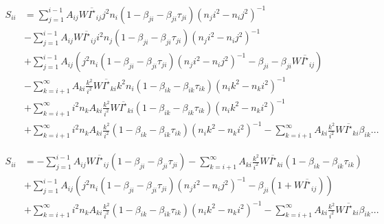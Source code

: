 \documentclass{article}
\begin{document}
\begin{equation}
    \begin{aligned}
        S_{ii} &= \sum\limits_{j=1}^{i-1} A_{ij}W\overline{I^\star}_{ij}j^2n_i (1 - \beta_{ji} - \beta_{ji}\tau_{ji})(n_ji^2 - n_ij^2)^{-1}\\
        &-\sum\limits_{j=1}^{i-1} A_{ij}W\overline{I^\star}_{ij}i^2n_j(1 - \beta_{ji} - \beta_{ji}\tau_{ji})(n_ji^2 - n_ij^2)^{-1}\\
        &+\sum\limits_{j=1}^{i-1} A_{ij}\left(j^2n_i (1 - \beta_{ji} - \beta_{ji}\tau_{ji})(n_ji^2 - n_ij^2)^{-1} -\beta_{ji}-\beta_{ji}W\overline{I^\star}_{ij}\right)\\
        &-\sum\limits_{k=i+1}^\infty A_{ki}\frac{k^2}{i^2}W\overline{I^\star}_{ki}k^2n_i(1 - \beta_{ik} - \beta_{ik}\tau_{ik})(n_ik^2 - n_ki^2)^{-1}\\
        &+\sum\limits_{k=i+1}^\infty i^2n_kA_{ki}\frac{k^2}{i^2}W\overline{I^\star}_{ki}(1 - \beta_{ik} - \beta_{ik}\tau_{ik})(n_ik^2 - n_ki^2)^{-1}\\
        &+\sum\limits_{k=i+1}^\infty i^2n_kA_{ki}\frac{k^2}{i^2}(1 - \beta_{ik} - \beta_{ik}\tau_{ik})(n_ik^2 - n_ki^2)^{-1}-\sum\limits_{k=i+1}^\infty A_{ki}\frac{k^2}{i^2}W\overline{I^\star}_{ki}\beta_{ik}...
    \end{aligned}
\end{equation}

\begin{equation}
    \begin{aligned}
        S_{ii} &= -\sum\limits_{j=1}^{i-1} A_{ij}W\overline{I^\star}_{ij}(1 - \beta_{ji} - \beta_{ji}\tau_{ji})-\sum\limits_{k=i+1}^\infty A_{ki}\frac{k^2}{i^2}W\overline{I^\star}_{ki}(1 - \beta_{ik} - \beta_{ik}\tau_{ik})\\
        &+\sum\limits_{j=1}^{i-1} A_{ij}\left(j^2n_i (1 - \beta_{ji} - \beta_{ji}\tau_{ji})(n_ji^2 - n_ij^2)^{-1} -\beta_{ji}(1+W\overline{I^\star}_{ij})\right)\\
        &+\sum\limits_{k=i+1}^\infty i^2n_kA_{ki}\frac{k^2}{i^2}(1 - \beta_{ik} - \beta_{ik}\tau_{ik})(n_ik^2 - n_ki^2)^{-1}-\sum\limits_{k=i+1}^\infty A_{ki}\frac{k^2}{i^2}W\overline{I^\star}_{ki}\beta_{ik}...
    \end{aligned}
\end{equation}
\end{document}
